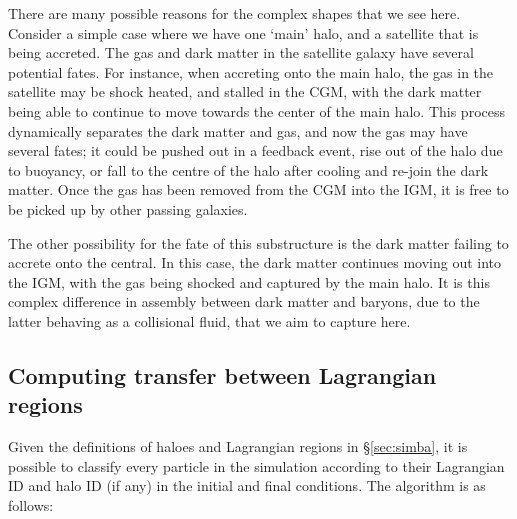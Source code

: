 There are many possible reasons for the complex shapes that we see here.
Consider a simple case where we have one `main' halo, and a satellite that is
being accreted. The gas and dark matter in the satellite galaxy have several
potential fates. For instance, when accreting onto the main halo, the gas in
the satellite may be shock heated, and stalled in the CGM, with the dark
matter being able to continue to move towards the center of the main halo.
This process dynamically separates the dark matter and gas, and now the gas
may have several fates; it could be pushed out in a feedback event, rise out
of the halo due to buoyancy, or fall to the centre of the halo after cooling
and re-join the dark matter. Once the gas has been removed from the CGM into
the IGM, it is free to be picked up by other passing galaxies.

The other possibility for the fate of this substructure is the dark matter
failing to accrete onto the central. In this case, the dark matter continues
moving out into the IGM, with the gas being shocked and captured by the main
halo. It is this complex difference in assembly between dark matter and
baryons, due to the latter behaving as a collisional fluid, that we aim to
capture here.

\subsection{Computing transfer between Lagrangian regions}

Given the definitions of haloes and Lagrangian regions in
\S \ref{sec:simba}, it is possible to classify every particle in the
simulation according to their Lagrangian ID and halo ID (if any) in the
initial and final conditions. The algorithm is as follows:

